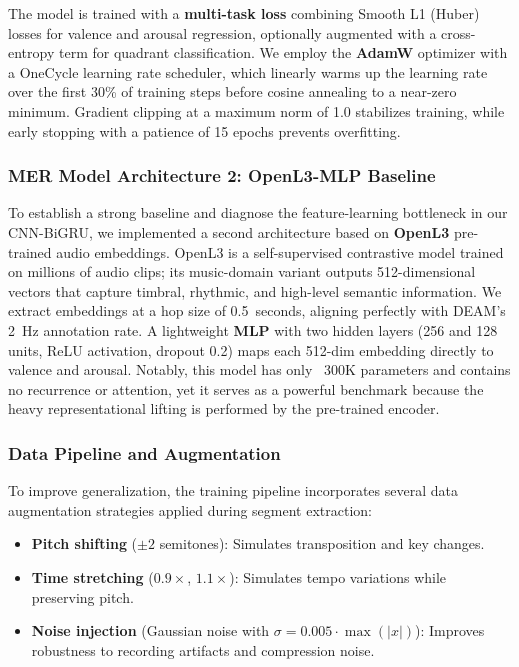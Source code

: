 \documentclass[12pt,a4paper]{article}
\begin{document}
The model is trained with a \textbf{multi-task loss} combining Smooth L1 (Huber) losses for valence and arousal regression, optionally augmented with a cross-entropy term for quadrant classification. We employ the \textbf{AdamW} optimizer with a OneCycle learning rate scheduler, which linearly warms up the learning rate over the first 30\% of training steps before cosine annealing to a near-zero minimum. Gradient clipping at a maximum norm of 1.0 stabilizes training, while early stopping with a patience of 15 epochs prevents overfitting.

\subsubsection{MER Model Architecture 2: OpenL3-MLP Baseline}

To establish a strong baseline and diagnose the feature-learning bottleneck in our CNN-BiGRU, we implemented a second architecture based on \textbf{OpenL3} pre-trained audio embeddings. OpenL3 is a self-supervised contrastive model trained on millions of audio clips; its music-domain variant outputs 512-dimensional vectors that capture timbral, rhythmic, and high-level semantic information. We extract embeddings at a hop size of 0.5~seconds, aligning perfectly with DEAM's 2~Hz annotation rate. A lightweight \textbf{MLP} with two hidden layers (256 and 128 units, ReLU activation, dropout 0.2) maps each 512-dim embedding directly to valence and arousal. Notably, this model has only ~300K parameters and contains no recurrence or attention, yet it serves as a powerful benchmark because the heavy representational lifting is performed by the pre-trained encoder.

\subsubsection{Data Pipeline and Augmentation}

To improve generalization, the training pipeline incorporates several data augmentation strategies applied during segment extraction:
\begin{itemize}
    \item \textbf{Pitch shifting} ($\pm 2$ semitones): Simulates transposition and key changes.
    \item \textbf{Time stretching} ($0.9\times$, $1.1\times$): Simulates tempo variations while preserving pitch.
    \item \textbf{Noise injection} (Gaussian noise with $\sigma = 0.005 \cdot \max(|x|)$): Improves robustness to recording artifacts and compression noise.
\end{itemize}
\end{document}
